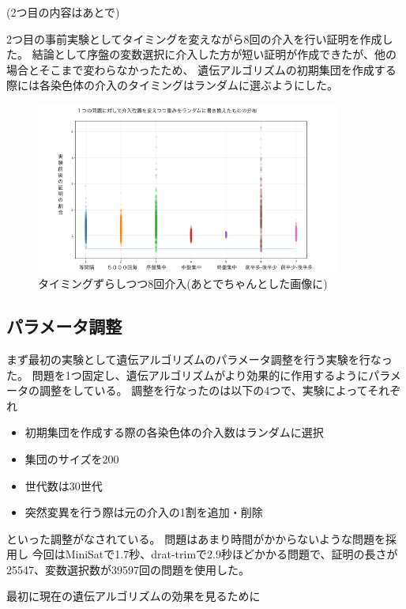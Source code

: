 
(2つ目の内容はあとで)

2つ目の事前実験としてタイミングを変えながら8回の介入を行い証明を作成した。
結論として序盤の変数選択に介入した方が短い証明が作成できたが、他の場合とそこまで変わらなかったため、
遺伝アルゴリズムの初期集団を作成する際には各染色体の介入のタイミングはランダムに選ぶようにした。

\begin{figure}[h]
    \centering
    \includegraphics[width=10cm]{figures/Experiment0/1.png}
    \caption{タイミングずらしつつ8回介入(あとでちゃんとした画像に)}
\end{figure}



\subsection{パラメータ調整}%

まず最初の実験として遺伝アルゴリズムのパラメータ調整を行う実験を行なった。
問題を1つ固定し、遺伝アルゴリズムがより効果的に作用するようにパラメータの調整をしている。
調整を行なったのは以下の4つで、実験によってそれぞれ
\begin{itemize}
    \item 初期集団を作成する際の各染色体の介入数はランダムに選択
    \item 集団のサイズを200
    \item 世代数は30世代
    \item 突然変異を行う際は元の介入の1割を追加・削除
\end{itemize}
といった調整がなされている。
問題はあまり時間がかからないような問題を採用し
今回はMiniSatで1.7秒、drat-trimで2.9秒ほどかかる問題で、証明の長さが25547、変数選択数が39597回の問題を使用した。


最初に現在の遺伝アルゴリズムの効果を見るために

